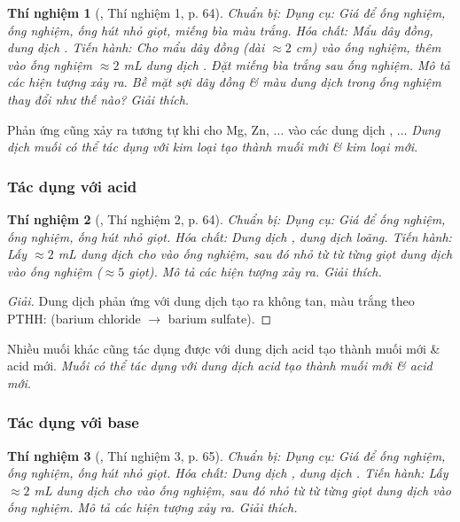 \documentclass{article}
\newtheorem{thinghiem}{Thí nghiệm}
\begin{document}
\begin{thinghiem}[\cite{SGK_KHTN_8_Canh_Dieu}, Thí nghiệm 1, p. 64]
	{\rm Chuẩn bị:} Dụng cụ: Giá để ống nghiệm, ống nghiệm, ống hút nhỏ giọt, miếng bìa màu trắng. Hóa chất: Mẩu dây đồng, dung dịch {\rm{}}. {\rm Tiến hành:} Cho mẩu dây đồng (dài $\approx2$ {\rm cm}) vào ống nghiệm, thêm vào ống nghiệm $\approx2$ {\rm mL} dung dịch {\rm{}}. Đặt miếng bìa trắng sau ống nghiệm. Mô tả các hiện tượng xảy ra. Bề mặt sợi dây đồng \& màu dung dịch trong ống nghiệm thay đổi như thế nào? Giải thích.
\end{thinghiem}
Phản ứng cũng xảy ra tương tự khi cho Mg, Zn, $\ldots$ vào các dung dịch , $\ldots$ \textit{Dung dịch muối có thể tác dụng với kim loại tạo thành muối mới \& kim loại mới}.

\subsubsection{Tác dụng với acid}

\begin{thinghiem}[\cite{SGK_KHTN_8_Canh_Dieu}, Thí nghiệm 2, p. 64]
	{\rm Chuẩn bị:} Dụng cụ: Giá để ống nghiệm, ống nghiệm, ống hút nhỏ giọt. Hóa chất: Dung dịch {\rm{}}, dung dịch {\rm{}} loãng. {\rm Tiến hành:} Lấy $\approx2$ {\rm mL} dung dịch {\rm{}} cho vào ống nghiệm, sau đó nhỏ từ từ từng giọt dung dịch {\rm{}} vào ống nghiệm ($\approx5$ giọt). Mô tả các hiện tượng xảy ra. Giải thích.
\end{thinghiem}

\begin{proof}[Giải]
	Dung dịch  phản ứng với dung dịch  tạo ra  không tan, màu trắng theo PTHH:  (barium chloride $\to$ barium sulfate).
\end{proof}
Nhiều muối khác cũng tác dụng được với dung dịch acid tạo thành muối mới \& acid mới. \textit{Muối có thể tác dụng với dung dịch acid tạo thành muối mới \& acid mới}.

\subsubsection{Tác dụng với base}

\begin{thinghiem}[\cite{SGK_KHTN_8_Canh_Dieu}, Thí nghiệm 3, p. 65]
	{\rm Chuẩn bị:} Dụng cụ: Giá để ống nghiệm, ống nghiệm, ống hút nhỏ giọt. Hóa chất: Dung dịch {\rm{}}, dung dịch {\rm{}}. {\rm Tiến hành:} Lấy $\approx2$ {\rm mL} dung dịch {\rm{}} cho vào ống nghiệm, sau đó nhỏ từ từ từng giọt dung dịch {\rm{}} vào ống nghiệm. Mô tả các hiện tượng xảy ra. Giải thích.
\end{thinghiem}
\end{document}
